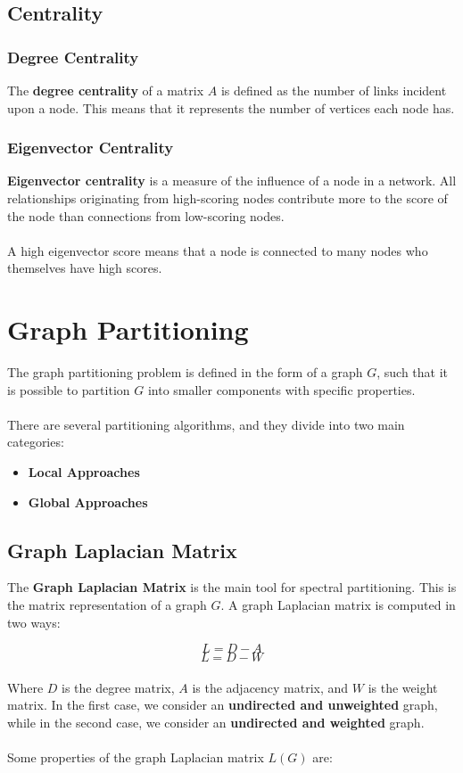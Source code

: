 \documentclass{article}
\begin{document}
\subsection{Centrality}
\subsubsection{Degree Centrality}
The \textbf{degree centrality} of a matrix $A$ is defined as the number of links incident upon a node. This means that it represents the number of vertices each node has.

\subsubsection{Eigenvector Centrality}
\textbf{Eigenvector centrality} is a measure of the influence of a node in a network. All relationships originating from high-scoring nodes contribute more to the score of the node than connections from low-scoring nodes. \\ \\
A high eigenvector score means that a node is connected to many nodes who themselves have high scores.

\section{Graph Partitioning}
The graph partitioning problem is defined in the form of a graph $G$, such that it is possible to partition $G$ into smaller components with specific properties. \\ \\
There are several partitioning algorithms, and they divide into two main categories:

\begin{itemize}
	\item \textbf{Local Approaches}
	\item \textbf{Global Approaches}
\end{itemize}

\subsection{Graph Laplacian Matrix}
The \textbf{Graph Laplacian Matrix} is the main tool for spectral partitioning. This is the matrix representation of a graph $G$. A graph Laplacian matrix is computed in two ways:

\[ L = D - A \]
\[ L = D - W \] \\
Where $D$ is the degree matrix, $A$ is the adjacency matrix, and $W$ is the weight matrix. In the first case, we consider an \textbf{undirected and unweighted} graph, while in the second case, we consider an \textbf{undirected and weighted} graph. \\ \\
Some properties of the graph Laplacian matrix $L(G)$ are:
\end{document}
